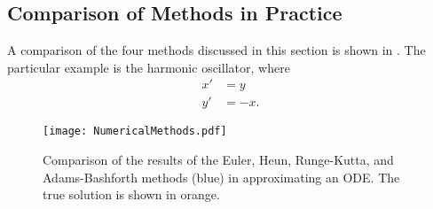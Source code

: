 \vfill
\pagebreak
\subsection{Comparison of Methods in Practice}

A comparison of the four methods discussed in this section is shown in . The particular example is the harmonic oscillator, where
\begin{align*}
	x' &= y \\
	y' &= -x.
\end{align*}

\begin{figure}[!ht]
	\centering
	\texttt{[image: NumericalMethods.pdf]}
	\caption{Comparison of the results of the Euler, Heun, Runge-Kutta, and Adams-Bashforth methods (blue) in approximating an ODE. The true solution is shown in orange.}
	\label{fig:numericals}
\end{figure}